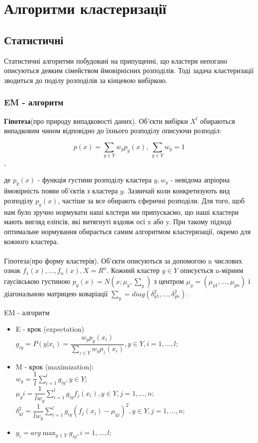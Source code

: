 \documentclass[a4paper,14pt,russian]{extreport}
\begin{document}
\chapter{Алгоритми кластеризації}

	\section{Статистичні}
	Статистичні алгоритми побудовані на припущенні, що кластери непогано описуються деяким сімейством ймовірнісних розподілів. Тоді задача кластеризації зводиться до поділу розподілів за кінцевою вибіркою.
	\subsection{EM - алгоритм}
	\textbf{Гіпотеза}(про природу випадковості даних). Об'єкти вибірки  $X^l$ обираються випадковим чином відповідно до їхнього розподілу описуючи розподіл:
	
	$$ p(x) = \sum_{y \in Y}w_y p_y (x), \ \sum_{y \in Y}w_y = 1$$,
	
	де $p_{y}(x)$ - функція густини розподілу кластера $y, w_y$ - невідома апріорна ймовірність появи об'єктів з кластера $y$. Зазвичай коли конкретизують вид розподілу $p_y(x)$, частіше за все обирають сферичні розподіли. Для того, щоб нам було зручно нормувати наші клстери ми припускаємо, що наші кластери мають вигляд еліпсів, які витягнуті вздовж осі x або y. При такому підході оптимальне нормування обирається самим алгоритмом кластеризації, окремо для кожного кластера.\\ \\
	Гіпотеза(про форму кластерів). Об'єкти описуються за допомогою n числових ознак $f_1(x),...,f_n(x), X= R^n $. Кожний кластер $y \in Y$ описується n-мірним гаусівською густиною $p_y(x) = N (x;\mu_y, \sum_{y})$ з центром $ \mu_{y} = (\mu_{y1}, ..., \mu_{yn})$ і діагональною матрицею коваріації $\sum_{y} = diag(\delta_{y1}^2,...,\delta_{yn}^2)$.
	\par EM - алгоритм
	
	\begin{itemize}
		
		\item E - крок	(expectation)\\
		$g_{iy} = P(y|x_i) = \dfrac{w_y p_y(x_i)}{\sum_{z \in Y} w_y p_z(x_i)}, y \in Y, i = 1,...,l;$
		\item M - крок (maximization): \\
			$w_y = \dfrac{1}{l} \sum_{i=1}^{l} g_{iy}, y \in Y;$\\
			$\mu_yi = \dfrac{1}{lw_y} \sum_{i=1}^{l} g_{iy} f_j(x_i), y \in Y, j =1,...,n;$\\
			$\delta_{yj}^{2} = \dfrac{1}{lw_y} \sum_{i=1}^{l} g_{iy}(f_j(x_i) - \mu_{yj})^2, y \in Y,  j =1,...,n; $
			
			\item 
			$y_i = arg \max_{y \in Y} g_{iy}, i=1,...,l;$
	
	
	\end{itemize}
	
\end{document}
